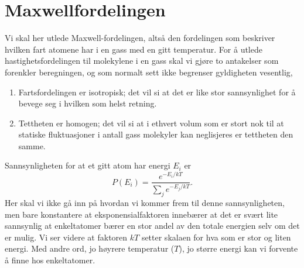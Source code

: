 \chapter{Maxwellfordelingen}
\label{apx:maxwellfordeling}
Vi skal her utlede Maxwell-fordelingen, altså den fordelingen som beskriver hvilken fart atomene har i en gass med en gitt temperatur. For å utlede hastighetsfordelingen til molekylene i en gass skal vi gjøre to antakelser som forenkler beregningen, og som normalt sett ikke begrenser gyldigheten vesentlig,
\begin{enumerate}
	\item
	Fartsfordelingen er isotropisk; det vil si at det er like stor sannsynlighet for å bevege seg i hvilken som helst retning.
	\item
 	Tettheten er homogen; det vil si at i ethvert volum som er stort nok til at statiske fluktuasjoner i antall gass molekyler kan neglisjeres er tettheten den samme.
\end{enumerate}
Sannsynligheten for at et gitt atom har energi $E_i$ er 
\begin{displaymath}
	P(E_i) = \frac{e^{-E_i/kT}}{\sum_j e^{-E_j/kT}}.
\end{displaymath}
Her skal vi ikke gå inn på hvordan vi kommer frem til denne sannsynligheten, men bare konstantere at eksponensialfaktoren innebærer at det er svært lite sannsynlig at enkeltatomer bærer en stor andel av den totale energien selv om det er mulig. Vi ser videre at faktoren $kT$ setter skalaen for hva som er stor og liten energi. Med andre ord, jo høyrere temperatur ($T$), jo større energi kan vi forvente å finne hos enkeltatomer. 

